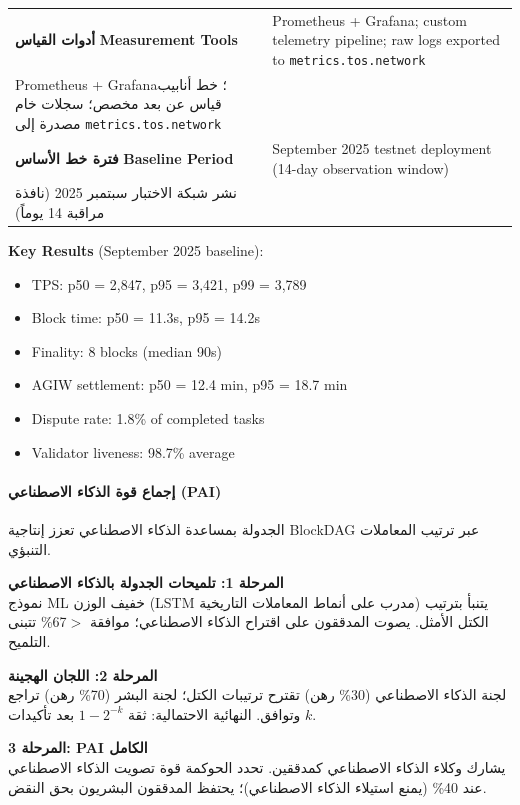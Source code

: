 \documentclass[11pt]{article}
\begin{document}
\begin{table}[H]
\begin{tabular}{@{}p{}p{}@{}}
\textbf{أدوات القياس} \textbf{Measurement Tools} & Prometheus + Grafana; custom telemetry pipeline; raw logs exported to \texttt{metrics.tos.network} \\ Prometheus + Grafana؛ خط أنابيب قياس عن بعد مخصص؛ سجلات خام مصدرة إلى \texttt{metrics.tos.network} \\
\textbf{فترة خط الأساس} \textbf{Baseline Period} & September 2025 testnet deployment (14-day observation window) \\ نشر شبكة الاختبار سبتمبر 2025 (نافذة مراقبة 14 يوماً) \\
\bottomrule
\end{tabular}
\end{table}

\textbf{Key Results} (September 2025 baseline):
\begin{itemize}[noitemsep]
  \item TPS: p50 = 2,847, p95 = 3,421, p99 = 3,789
  \item Block time: p50 = 11.3s, p95 = 14.2s
  \item Finality: 8 blocks (median 90s)
  \item AGIW settlement: p50 = 12.4 min, p95 = 18.7 min
  \item Dispute rate: 1.8\% of completed tasks
  \item Validator liveness: 98.7\% average
\end{itemize}

\paragraph{إجماع قوة الذكاء الاصطناعي (PAI)}
الجدولة بمساعدة الذكاء الاصطناعي تعزز إنتاجية BlockDAG عبر ترتيب المعاملات التنبؤي.

\textbf{المرحلة 1: تلميحات الجدولة بالذكاء الاصطناعي}\\
نموذج ML خفيف الوزن (LSTM مدرب على أنماط المعاملات التاريخية) يتنبأ بترتيب الكتل الأمثل. يصوت المدققون على اقتراح الذكاء الاصطناعي؛ موافقة $>$67\% تتبنى التلميح.

\textbf{المرحلة 2: اللجان الهجينة}\\
لجنة الذكاء الاصطناعي (30\% رهن) تقترح ترتيبات الكتل؛ لجنة البشر (70\% رهن) تراجع وتوافق. النهائية الاحتمالية: ثقة $1 - 2^{-k}$ بعد تأكيدات $k$.

\textbf{المرحلة 3: PAI الكامل}\\
يشارك وكلاء الذكاء الاصطناعي كمدققين. تحدد الحوكمة قوة تصويت الذكاء الاصطناعي عند 40\% (يمنع استيلاء الذكاء الاصطناعي)؛ يحتفظ المدققون البشريون بحق النقض.
\end{document}
